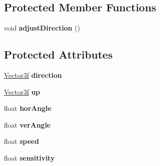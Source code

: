 \subsection*{Protected Member Functions}
\begin{DoxyCompactItemize}
\item 
\hypertarget{class_movable_a8dac940ac238b478d016b6227044d2c5}{void {\bfseries adjust\-Direction} ()}\label{class_movable_a8dac940ac238b478d016b6227044d2c5}

\end{DoxyCompactItemize}
\subsection*{Protected Attributes}
\begin{DoxyCompactItemize}
\item 
\hypertarget{class_movable_aeae0d062d09b8659182f9be8f004963f}{\hyperlink{struct_vector3f}{Vector3f} {\bfseries direction}}\label{class_movable_aeae0d062d09b8659182f9be8f004963f}

\item 
\hypertarget{class_movable_ac05c8403c3e9337f6e00181f6ae424e2}{\hyperlink{struct_vector3f}{Vector3f} {\bfseries up}}\label{class_movable_ac05c8403c3e9337f6e00181f6ae424e2}

\item 
\hypertarget{class_movable_a95df818eb0776079c7274c0e5b74ce0a}{float {\bfseries hor\-Angle}}\label{class_movable_a95df818eb0776079c7274c0e5b74ce0a}

\item 
\hypertarget{class_movable_a19dcbc2a57c5b8c8513eac318950f3f4}{float {\bfseries ver\-Angle}}\label{class_movable_a19dcbc2a57c5b8c8513eac318950f3f4}

\item 
\hypertarget{class_movable_a9baa39cc91e57f058ca9d7d073229f37}{float {\bfseries speed}}\label{class_movable_a9baa39cc91e57f058ca9d7d073229f37}

\item 
\hypertarget{class_movable_a2fa2a054852ed47f6dd3346641c902e7}{float {\bfseries sensitivity}}\label{class_movable_a2fa2a054852ed47f6dd3346641c902e7}

\end{DoxyCompactItemize}


